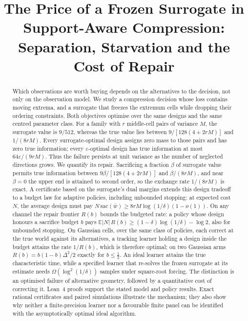 



\title{The Price of a Frozen Surrogate in Support-Aware Compression:\\
Separation, Starvation and the Cost of Repair}

\author{
}

\maketitle

\begin{abstract}
Which observations are worth buying depends on the alternatives to the decision, not only on
the observation model. We study a compression decision whose loss contains moving extrema,
and a surrogate that freezes the extremum cells while dropping their ordering constraints.
Both objectives optimise over the same designs and the same centred parameter class.
For a family with $r$ middle-cell pairs of variance $M$, the surrogate value is $9/512$,
whereas the true value lies between $9/[128(4+2rM)]$ and $1/(8rM)$.
Every surrogate-optimal design assigns zero mass to those pairs and has zero true information;
every $\varepsilon$-optimal design has true information at most $64\varepsilon/(9rM)$.
Thus the failure persists at unit variance as the number of neglected directions grows.
We quantify its repair. Sacrificing a fraction $\beta$ of surrogate value permits true
information between $9\beta/[128(4+2rM)]$ and $\beta/(8rM)$, and near $\beta=0$ the upper end
is attained to second order, so the exchange rate $1/(8rM)$ is exact.
A certificate based on the surrogate's dual margins extends this design tradeoff to a budget
law for adaptive policies, including unbounded stopping: at expected cost $N$, the average
design must pay $N\,\mathrm{sac}(\bar w)\ge8rM\log(1/\delta)(1-o(1))$.
On any channel the repair frontier $R(b)$ bounds the budgeted rate: a policy whose design
honours a sacrifice budget $b$ pays $\mathbb E|N|\,R(b)\ge(1-\delta)\log(1/\delta)-\log2$, also
for unbounded stopping. On Gaussian cells, over the same class of policies, each correct at the
true world against its alternatives, a tracking learner holding a design inside the budget
attains the rate $1/R(b)$, which is therefore optimal; on two
Gaussian arms $R(b)=b(1-b)\Delta^2/2$ exactly for $b\le\frac12$.
An ideal learner attains the true characteristic time, while a specified learner that
re-solves the frozen surrogate at its estimate needs $\Omega(\log^2(1/\delta))$ samples under
square-root forcing. The distinction is an optimised failure of alternative geometry, followed
by a quantitative cost of correcting it. Lean~4 proofs support the stated model and policy
results. Exact rational certificates and paired simulations illustrate the mechanism;
they also show why neither a finite-precision learner nor a favourable finite panel can be
identified with the asymptotically optimal ideal algorithm.
\end{abstract}

